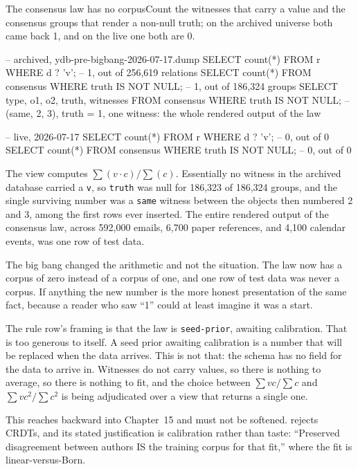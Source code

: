 \begin{Correspondence}{The consensus law has no corpus}{Count the witnesses that carry a value and the consensus groups that render a non-null truth; on the archived universe both came back 1, and on the live one both are 0.}
\begin{Check}
-- archived, ydb-pre-bigbang-2026-07-17.dump
SELECT count(*) FROM r WHERE d ? 'v';                    -- 1, out of 256,619 relations
SELECT count(*) FROM consensus WHERE truth IS NOT NULL;  -- 1, out of 186,324 groups
SELECT type, o1, o2, truth, witnesses FROM consensus WHERE truth IS NOT NULL;
    -- (same, 2, 3), truth = 1, one witness: the whole rendered output of the law

-- live, 2026-07-17
SELECT count(*) FROM r WHERE d ? 'v';                    -- 0, out of 0
SELECT count(*) FROM consensus WHERE truth IS NOT NULL;  -- 0, out of 0
\end{Check}
The view computes $\sum(v \cdot c) / \sum(c)$. Essentially no witness in the archived database carried a \texttt{v}, so \texttt{truth} was null for 186,323 of 186,324 groups, and the single surviving number was a \texttt{same} witness between the objects then numbered 2 and 3, among the first rows ever inserted. The entire rendered output of the consensus law, across 592,000 emails, 6,700 paper references, and 4,100 calendar events, was one row of test data.

The big bang changed the arithmetic and not the situation. The law now has a corpus of zero instead of a corpus of one, and one row of test data was never a corpus. If anything the new number is the more honest presentation of the same fact, because a reader who saw ``1'' could at least imagine it was a start.

The rule row's framing is that the law is \texttt{seed-prior}, awaiting calibration. That is too generous to itself. A seed prior awaiting calibration is a number that will be replaced when the data arrives. This is not that: the schema has no field for the data to arrive in. Witnesses do not carry values, so there is nothing to average, so there is nothing to fit, and the choice between $\sum vc/\sum c$ and $\sum vc^2/\sum c^2$ is being adjudicated over a view that returns a single one.
\end{Correspondence}

This reaches backward into Chapter~15 and must not be softened.  rejects CRDTs, and its stated justification is calibration rather than taste: ``Preserved disagreement between authors IS the training corpus for that fit,'' where the fit is linear-versus-Born.


